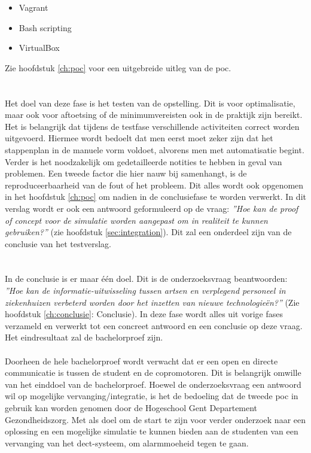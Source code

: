 \begin{itemize}
    \item Vagrant
    \item Bash scripting
    \item VirtualBox
\end{itemize}

Zie hoofdstuk \ref{ch:poc} voor een uitgebreide uitleg van de \gls{poc}.


\section{}
\label{sec:use}
Het doel van deze fase is het testen van de opstelling. Dit is voor optimalisatie, maar ook voor aftoetsing of de minimumvereisten ook in de praktijk zijn bereikt. Het is belangrijk dat tijdens de testfase verschillende activiteiten correct worden uitgevoerd. Hiermee wordt bedoelt dat men eerst moet zeker zijn dat het stappenplan in de manuele vorm voldoet, alvorens men met automatisatie begint. Verder is het noodzakelijk om gedetailleerde notities te hebben in geval van problemen. Een tweede factor die hier nauw bij samenhangt, is de reproduceerbaarheid van de fout of het probleem.  Dit alles wordt ook opgenomen in het hoofdstuk \ref{ch:poc} om nadien in de conclusiefase te worden verwerkt. In dit verslag wordt er ook een antwoord geformuleerd op de vraag: \textit{''Hoe kan de proof of concept voor de simulatie worden aangepast om in realiteit te kunnen gebruiken?''} (zie hoofdstuk \ref{sec:integration}). Dit zal een onderdeel zijn van de conclusie van het testverslag.
\section{}
\label{sec:conclusion}
In de conclusie is er maar \'{e}\'{e}n doel. Dit is de onderzoeksvraag beantwoorden: \textit{''Hoe kan de informatie-uitwisseling tussen artsen en verplegend personeel in ziekenhuizen verbeterd worden door het inzetten van nieuwe technologieën?''} (Zie hoofdstuk \ref{ch:conclusie}: Conclusie). In deze fase wordt alles uit vorige fases verzameld en verwerkt tot een concreet antwoord en een conclusie op deze vraag. Het eindresultaat zal de bachelorproef zijn. 
\\\\
Doorheen de hele bachelorproef wordt verwacht dat er een open en directe communicatie is tussen de student en de copromotoren. Dit is belangrijk omwille van het einddoel van de bachelorproef. Hoewel de onderzoeksvraag een antwoord wil op mogelijke vervanging/integratie, is het de bedoeling dat de tweede \gls{poc} in gebruik kan worden genomen door de Hogeschool Gent Departement Gezondheidszorg. Met als doel om de start te zijn voor verder onderzoek naar een oplossing en een mogelijke simulatie te kunnen bieden aan de studenten van een vervanging van het \gls{dect}-systeem, om alarmmoeheid tegen te gaan.

